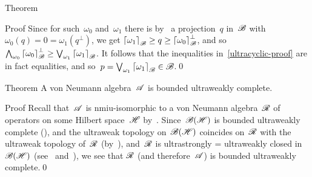 \documentclass[a]{subfiles}
\begin{document}
\begin{parsec}
\begin{point}{Theorem}
\begin{point}{Proof}
Since for such~$\omega_0$ and~$\omega_1$
there is 
by~
a projection~$q$ in~$\mathscr{B}$
with $\omega_0(q)=0=\omega_1(q^\perp)$,
we get 
$\left\lceil\omega_1\right\rceil_{\mathscr{B}} \geq q \geq 
\left\lceil\omega_0\right\rceil_{\mathscr{B}}^\perp$,
and so~$\bigwedge_{\omega_0} \left\lceil\omega_0\right\rceil_{\mathscr{B}}^\perp 
\geq \bigvee_{\omega_1} \left\lceil\omega_1\right\rceil_{\mathscr{B}}$.
It follows that the inequalities in~\eqref{ultracyclic-proof}
are in fact equalities,
and so~$p=\bigvee_{\omega_1}\left\lceil\omega_1\right\rceil_{\mathscr{B}} \in \mathscr{B}$.\qed
\end{point}
\end{point}
\begin{point}{Theorem}%
A von Neumann algebra~$\mathscr{A}$ is bounded ultraweakly complete.
\begin{point}{Proof}%
Recall that~$\mathscr{A}$
is nmiu-isomorphic
to a von Neumann algebra~$\mathscr{R}$ of operators on some Hilbert space~$\mathscr{H}$
by~.
Since~$\mathscr{B}(\mathscr{H})$ is bounded ultraweakly complete 
(),
and the ultraweak topology on~$\mathscr{B}(\mathscr{H})$
coincides on~$\mathscr{R}$ with the ultraweak topology of~$\mathscr{R}$
(by~),
and~$\mathscr{R}$ is 
 ultrastrongly = ultraweakly closed in~$\mathscr{B}(\mathscr{H})$
(see~ and~),
we see that $\mathscr{R}$ (and therefore~$\mathscr{A}$) is 
bounded  ultraweakly complete.\qed
\end{point}
\end{point}
\end{parsec}




\end{document}
